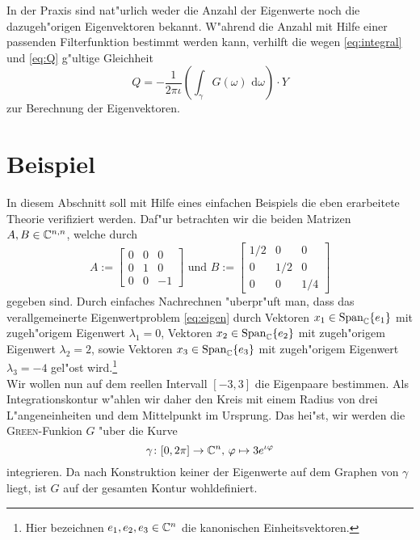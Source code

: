 In der Praxis sind nat"urlich weder die Anzahl der Eigenwerte noch die dazugeh"origen Eigenvektoren
bekannt. W"ahrend die Anzahl mit Hilfe einer passenden Filterfunktion bestimmt werden kann,
verhilft die wegen \eqref{eq:integral} und \eqref{eq:Q} g"ultige Gleichheit
\begin{equation}\label{eq:solution}
Q = -\frac{1}{2\pi\iota}\left(\int_\gamma G(\omega)\text{ d}\omega\right)\cdot Y
\end{equation}
zur Berechnung der Eigenvektoren.

\newpage
\section{Beispiel}\label{sec:bsp}

In diesem Abschnitt soll mit Hilfe eines einfachen Beispiels die eben erarbeitete
Theorie verifiziert werden. Daf"ur betrachten wir die beiden Matrizen
$A,B \in \mathbb{C}^{n,n}$, welche durch
\[
A:= \begin{bmatrix} 0 & 0 & 0 \\ 0 & 1 & 0 \\ 0 & 0 & -1 \end{bmatrix} \text{ und }
B:= \begin{bmatrix} 1/2 & 0 & 0\\ 0 & 1/2 & 0 \\ 0 & 0 & 1/4 \end{bmatrix}
\]
gegeben sind. Durch einfaches Nachrechnen "uberpr"uft man, dass das
verallgemeinerte Eigenwertproblem \eqref{eq:eigen} durch Vektoren
$x_1 \in \text{Span}_{\mathbb{C}}\{e_1\}$ mit zugeh"origem Eigenwert $\lambda_1 = 0$, Vektoren
$x_2 \in \text{Span}_{\mathbb{C}}\{e_2\}$ mit zugeh"origem Eigenwert $\lambda_2 = 2$, sowie
Vektoren $x_3 \in\text{Span}_{\mathbb{C}}\{e_3\}$ mit zugeh"origem Eigenwert $\lambda_3 = -4$
gel"ost wird.\footnote{Hier bezeichnen $e_1, e_2, e_3 \in\mathbb{C}^n$ die kanonischen Einheitsvektoren.}\\

Wir wollen nun auf dem reellen Intervall $[-3,3]$ die Eigenpaare bestimmen.
Als Integrationskontur w"ahlen wir daher den Kreis mit einem Radius von drei
L"angeneinheiten und dem Mittelpunkt im Ursprung. Das hei"st, wir werden die
\textsc{Green}-Funkion $G$ "uber die Kurve
\begin{equation}\label{kurve}
\gamma\colon [0,2\pi]\to\mathbb{C}^n\text{, }\varphi\mapsto 3e^{\iota \varphi}
\end{equation}
integrieren. Da nach Konstruktion keiner der Eigenwerte auf dem
Graphen von $\gamma$ liegt, ist $G$ auf der gesamten Kontur wohldefiniert.

